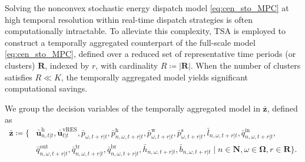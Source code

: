 \documentclass[a4paper,fleqn]{cas-sc}
\begin{document}
Solving the nonconvex stochastic energy dispatch model \eqref{eq:cen_sto_MPC} at high temporal resolution within real-time dispatch strategies is often computationally intractable.
To alleviate this complexity, TSA is employed to construct a temporally aggregated counterpart of the full-scale model \eqref{eq:cen_sto_MPC},
defined over a reduced set of representative time periods (or clusters) $\boldsymbol{R}$, indexed by $r$, with cardinality $R \coloneqq |\boldsymbol{R}|$.
When the number of clusters satisfies $R \ll K$, the temporally aggregated model yields significant computational savings.

We group the decision variables of the temporally aggregated model in $\boldsymbol{\bar{z}}$, defined as
\begin{equation}
\begin{aligned}
\boldsymbol{\bar{z}} \coloneqq \Big\{
& \boldsymbol{\bar{u}}^{\boldsymbol{\mathrm{h}}}_{n, t|t},
\boldsymbol{\bar{u}}^{\boldsymbol{\mathrm{vRES}}}_{t|t},
\bar{p}_{\omega,t+r|t},
\bar{p}^{\mathrm{h}}_{n,\omega,t+r|t},
\bar{p}^{\mathrm{w}}_{\omega,t+r|t},
\bar{p}^{\mathrm{s}}_{\omega,t+r|t},
\bar{l}_{n,\omega,t+r|t},
\bar{q}^{\mathrm{in}}_{n,\omega,t+r|t}, \\
& \bar{q}^{\mathrm{out}}_{n,\omega,t+r|t},
\bar{q}^{\mathrm{tr}}_{n,\omega,t+r|t},
\bar{q}^{\mathrm{br}}_{n,\omega,t+r|t},
\bar{h}_{n,\omega,t+r|t},
\bar{b}_{n,\omega,t+r|t}
\;\Big|\;
n \in \boldsymbol{N},
\omega \in \boldsymbol{\Omega},
r \in \boldsymbol{R}
\Big\}.
\end{aligned}
\end{equation}
\end{document}
